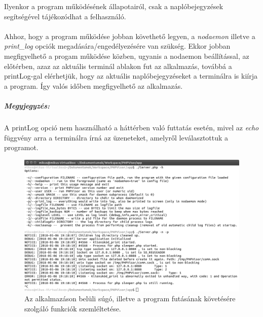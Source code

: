 \documentclass[12pt]{report}
\begin{document}
  Ilyenkor a program működésének állapotairól, csak a naplóbejegyzések segítségével tájékozódhat a felhasználó. 
  \paragraph{}
  Ahhoz, hogy a program működése jobban követhető legyen, a \textit{nodaemon} illetve a \textit{print\_log} opciók megadására/engedélyezésére van szükség. Ekkor jobban megfigyelhető a progam működése közben, ugyanis a nodaemon beállítással, az előtérben, azaz az aktuális terminál ablakon fut az alkalmazás, továbbá a printLog-gal elérhetjük, hogy az  aktuális naplóbejegyzéseket a terminálra is kiírja a program.
Így valós időben megfigyelhető az alkalmazás.
\subparagraph{Megyjegyzés:}
A printLog opció nem használható a háttérben való futtatás esetén, mivel az \textit{echo} függvény arra a terminálra írná az üzeneteket, amelyről leválasztottuk a programot.

  \begin{figure}[ht]
  \centering
  \includegraphics[width=14cm]{pics/run_print.png}
	  \caption{Az alkalmazáson belüli súgó, illetve  a program futásának követésére szolgáló funkciók szemléltetése.\newline}
      \label{fig:run_print}
  \end{figure}
\end{document}
